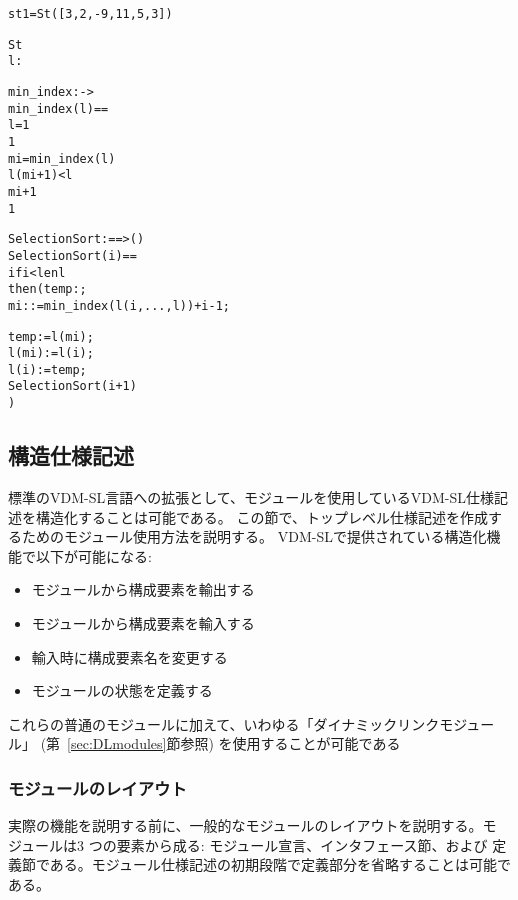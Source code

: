 \documentclass[\pformat,12pt]{jarticle}
\begin{document}
\begin{alltt}

    st1 = St([3,2,-9,11,5,3])

   St 
    l:


  min_index :  -> 
  min_index(l) ==
      l = 1
     1
      mi = min_index( l)
          l(mi+1) <  l
           mi+1
           1


  SelectionSort :  ==> ()
  SelectionSort (i) ==
    if i < len l
    then ( temp: ;
           mi :  := min_index(l(i,..., l)) + i - 1;
         
          temp := l(mi);
          l(mi) := l(i);
          l(i) := temp;
          SelectionSort(i+1)
         )
\end{alltt}






\subsection{構造仕様記述}

標準のVDM-SL言語への拡張として、モジュールを使用しているVDM-SL仕様記述を構造化することは可能である。
この節で、トップレベル仕様記述を作成するためのモジュール使用方法を説明する。
VDM-SLで提供されている構造化機能で以下が可能になる:
\begin{itemize}
\item モジュールから構成要素を輸出する
\item モジュールから構成要素を輸入する
\item 輸入時に構成要素名を変更する
\item モジュールの状態を定義する
\end{itemize}

これらの普通のモジュールに加えて、いわゆる「ダイナミックリンクモジュール」 (第~\ref{sec:DLmodules}節参照)
を使用することが可能である

\subsubsection{モジュールのレイアウト}
実際の機能を説明する前に、一般的なモジュールのレイアウトを説明する。モ
ジュールは3 つの要素から成る: モジュール宣言、インタフェース節、および
定義節である。モジュール仕様記述の初期段階で定義部分を省略することは可能である。
\end{document}
